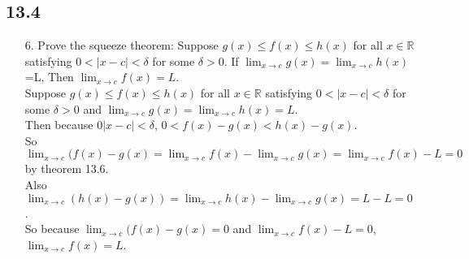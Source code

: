 \documentclass[sigconf]{article}
\begin{document}
\subsection*{13.4}
\begin{itemize}
  \item[6.] Prove the squeeze theorem: Suppose $g(x)\leq f(x)\leq h(x)$ for all $x\in\mathbb{R}$ satisfying $0<|x-c|<\delta$ for some $\delta>0$. If $\lim_{x\to c}g(x)=\lim_{x\to c}h(x)$=L, Then $\lim_{x\to c}f(x) = L$.\\ 
            Suppose $g(x)\leq f(x)\leq h(x)$ for all $x\in\mathbb{R}$ satisfying $0<|x-c|<\delta$ for some $\delta>0$ and $\lim_{x\to c}g(x)=\lim_{x\to c}h(x)=L$.\\
            Then because $0|x-c|<\delta$, $0<f(x)-g(x)<h(x)-g(x)$.\\
            So $\lim_{x\to c}(f(x)-g(x)=\lim_{x\to c}f(x)-\lim_{x\to c}g(x)=\lim_{x\to c}f(x)-L=0$ by theorem 13.6.\\
            Also $\lim_{x\to c}(h(x)-g(x))=\lim_{x\to c}h(x)-\lim_{x\to c}g(x)=L-L=0$.\\
            So because $\lim_{x\to c}(f(x)-g(x)=0$ and $\lim_{x\to c}f(x)-L=0$, $\lim_{x\to c}f(x)=L$.


\end{itemize}
\end{document}
